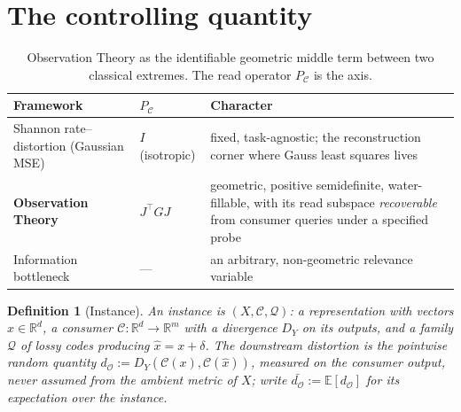 \documentclass[lettersize,onecolumn]{IEEEtran}
\newtheorem{definition}{Definition}
\theoremstyle{definition}
\theoremstyle{remark}
\newcommand{\PC}{P_{\mathcal{C}}}
\newcommand{\dO}{d_{\mathcal{O}}}
\newcommand{\E}{\mathbb{E}}
\newcommand{\R}{\mathbb{R}}
\begin{document}
\section{The controlling quantity}\label{sec:framework}

\begin{table}[!t]
\centering
\footnotesize
\caption{Observation Theory as the identifiable geometric middle term between two
classical extremes. The read operator $\PC$ is the axis.}
\label{tab:positioning}
\setlength{\tabcolsep}{6pt}\renewcommand{\arraystretch}{1.3}
\begin{tabular}{@{}L{3.0cm}L{2.1cm}L{6.2cm}@{}}
\toprule
\textbf{Framework} & \textbf{$\PC$} & \textbf{Character} \\
\midrule
Shannon rate--distortion (Gaussian MSE) & $I$ (isotropic) & fixed, task-agnostic; the reconstruction corner where Gauss least squares lives \\[2pt]
\textbf{Observation Theory} & $J^\top G J$ & geometric, positive semidefinite, water-fillable, with its read subspace \emph{recoverable} from consumer queries under a specified probe \\[2pt]
Information bottleneck & --- & an arbitrary, non-geometric relevance variable \\
\bottomrule
\end{tabular}
\end{table}

\begin{definition}[Instance]
An instance is $(X,\mathcal{C},\mathcal{Q})$: a representation with vectors
$x\in\R^{d}$, a \emph{consumer} $\mathcal{C}:\R^{d}\to\R^m$ with a divergence $D_Y$
on its outputs, and a family $\mathcal{Q}$ of lossy codes producing $\hat x=x+\delta$.
The downstream distortion is the pointwise random quantity
$\dO:=D_Y(\mathcal{C}(x),\mathcal{C}(\hat x))$, measured on the consumer output, never
assumed from the ambient metric of $X$; write $\bar{\dO}:=\E[\dO]$ for its expectation
over the instance.
\end{definition}
\end{document}
